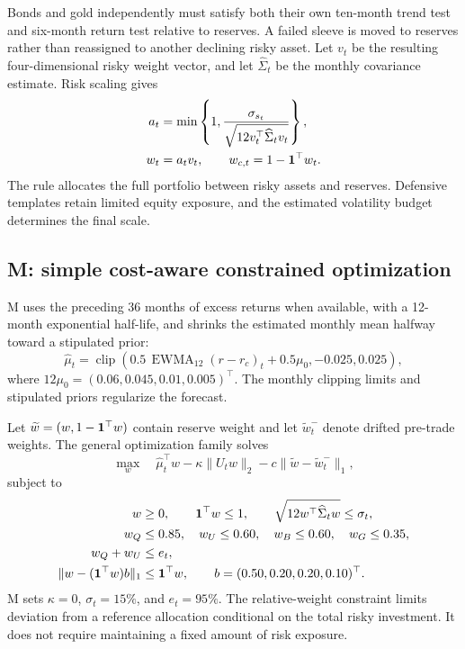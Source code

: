 \documentclass[12pt,letterpaper]{article}
\begin{document}
Bonds and gold independently must satisfy both their own ten-month trend test and six-month return test relative to reserves. A failed sleeve is moved to reserves rather than reassigned to another declining risky asset. Let $v_t$ be the resulting four-dimensional risky weight vector, and let $\widehat\Sigma_t$ be the monthly covariance estimate. Risk scaling gives
\begin{align}
a_t&=\min\left\{1,\frac{\sigma_{s_t}}{\sqrt{12v_t^\top\widehat\Sigma_t v_t}}\right\},\\
w_t&=a_tv_t,\qquad w_{c,t}=1-\mathbf 1^\top w_t.\label{eq:scaling}
\end{align}
The rule allocates the full portfolio between risky assets and reserves. Defensive templates retain limited equity exposure, and the estimated volatility budget determines the final scale.

\subsection{M: simple cost-aware constrained optimization}\label{sec:M}
M uses the preceding 36 months of excess returns when available, with a 12-month exponential half-life, and shrinks the estimated monthly mean halfway toward a stipulated prior:
\begin{equation}
\widehat\mu_t=\operatorname{clip}\left(0.5\,\operatorname{EWMA}_{12}(r-r_c)_t+0.5\mu_0,-0.025,0.025\right),
\end{equation}
where $12\mu_0=(0.06,0.045,0.01,0.005)^\top$. The monthly clipping limits and stipulated priors regularize the forecast.

Let $\widetilde w=(w,1-\mathbf 1^\top w)$ contain reserve weight and let $\widetilde w_t^{-}$ denote drifted pre-trade weights. The general optimization family solves
\begin{equation}
\max_w\quad \widehat\mu_t^\top w-\kappa\|U_tw\|_2-c\|\widetilde w-\widetilde w_t^{-}\|_1,\label{eq:opt}
\end{equation}
subject to
\begin{align}
w&\ge0,\qquad \mathbf 1^\top w\le1,\qquad \sqrt{12w^\top\widehat\Sigma_tw}\le\sigma_t,\\
w_Q&\le0.85,\quad w_U\le0.60,\quad w_B\le0.60,\quad w_G\le0.35,\\
w_Q+w_U&\le e_t,\\
\|w-(\mathbf 1^\top w)b\|_1&\le\mathbf 1^\top w,\qquad b=(0.50,0.20,0.20,0.10)^\top.\label{eq:relative}
\end{align}
M sets $\kappa=0$, $\sigma_t=15\%$, and $e_t=95\%$. The relative-weight constraint limits deviation from a reference allocation conditional on the total risky investment. It does not require maintaining a fixed amount of risk exposure.
\end{document}
